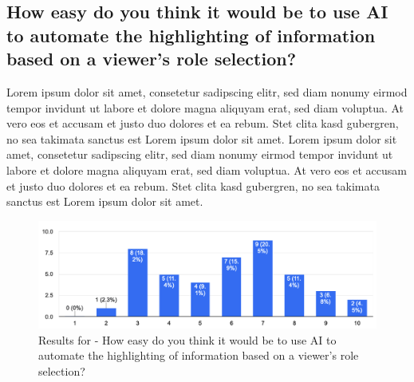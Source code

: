\subsection{How easy do you think it would be to use AI to automate the highlighting of information based on a viewer's role selection?}
Lorem ipsum dolor sit amet, consetetur sadipscing elitr, sed diam nonumy eirmod tempor invidunt ut labore et dolore magna aliquyam erat, sed diam voluptua. At vero eos et accusam et justo duo dolores et ea rebum. Stet clita kasd gubergren, no sea takimata sanctus est Lorem ipsum dolor sit amet. Lorem ipsum dolor sit amet, consetetur sadipscing elitr, sed diam nonumy eirmod tempor invidunt ut labore et dolore magna aliquyam erat, sed diam voluptua. At vero eos et accusam et justo duo dolores et ea rebum. Stet clita kasd gubergren, no sea takimata sanctus est Lorem ipsum dolor sit amet.
\begin{figure}[h!]
\centering
\includegraphics[width=\linewidth]{Images/Survey/documents_3.png}
\caption{Results for - How easy do you think it would be to use AI to automate the highlighting of information based on a viewer's role selection?}
\label{fig:results:highlighting:3}
\end{figure}

